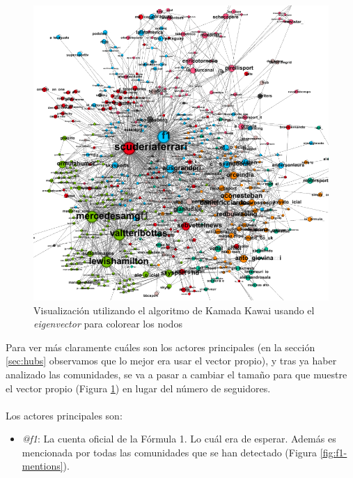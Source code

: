 \begin{figure}[H]
	\centering
	\includegraphics[width=14cm]{img/eigenvector}
	\caption{Visualización utilizando el algoritmo de Kamada Kawai usando el \textit{eigenvector} para colorear los nodos}
	\label{fig:eigenvector}
\end{figure}

Para ver más claramente cuáles son los actores principales (en la sección \ref{sec:hubs} observamos que lo mejor era usar el vector propio), y tras ya haber analizado las comunidades, se va a pasar a cambiar el tamaño para que muestre el vector propio (Figura \ref{fig:eigenvector}) en lugar del número de seguidores.
\\ \\
Los actores principales son:

\begin{itemize}
	\item \textit{@f1}: La cuenta oficial de la Fórmula 1. Lo cuál era de esperar. Además es mencionada por todas las comunidades que se han detectado (Figura \ref{fig:f1-mentions}).
\end{itemize}

